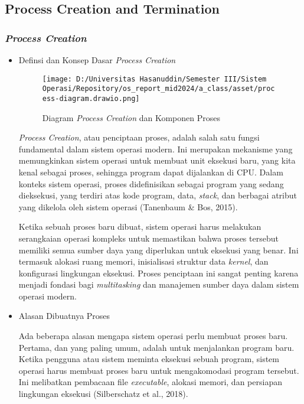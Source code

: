 \documentclass[12pt]{article}
\begin{document}
\subsection{Process Creation and Termination}

\subsubsection{\textit{Process Creation}}
\begin{itemize}
    \item Definsi dan Konsep Dasar \textit{Process Creation}
    
    \begin{figure}[h]
        \centering
        \texttt{[image: D:/Universitas Hasanuddin/Semester III/Sistem Operasi/Repository/os\_report\_mid2024/a\_class/asset/process-diagram.drawio.png]}
        \caption{Diagram \textit{Process Creation} dan Komponen Proses}
    \end{figure}
    
    \textit{Process Creation}, atau penciptaan proses, adalah 
    salah satu fungsi fundamental dalam sistem operasi 
    modern. Ini merupakan mekanisme yang memungkinkan sistem 
    operasi untuk membuat unit eksekusi baru, yang kita kenal 
    sebagai proses, sehingga program dapat dijalankan di CPU. 
    Dalam konteks sistem operasi, proses didefinisikan sebagai 
    program yang sedang dieksekusi, yang terdiri atas kode 
    program, data, \textit{stack}, dan berbagai atribut 
    yang dikelola oleh sistem operasi (Tanenbaum \& Bos, 2015).

    Ketika sebuah proses baru dibuat, sistem operasi harus 
    melakukan serangkaian operasi kompleks untuk memastikan 
    bahwa proses tersebut memiliki semua sumber daya yang 
    diperlukan untuk eksekusi yang benar. Ini termasuk alokasi 
    ruang memori, inisialisasi struktur data \textit{kernel}, dan 
    konfigurasi lingkungan eksekusi. Proses penciptaan ini 
    sangat penting karena menjadi fondasi bagi \textit{multitasking} 
    dan manajemen sumber daya dalam sistem operasi modern.

    \item Alasan Dibuatnya Proses
    
    Ada beberapa alasan mengapa sistem operasi perlu membuat 
    proses baru. Pertama, dan yang paling umum, adalah untuk 
    menjalankan program baru. Ketika pengguna atau sistem 
    meminta eksekusi sebuah program, sistem operasi harus 
    membuat proses baru untuk mengakomodasi program tersebut. 
    Ini melibatkan pembacaan file \textit{executable}, alokasi 
    memori, dan persiapan lingkungan eksekusi 
    (Silberschatz et al., 2018).


\end{itemize}
\end{document}
